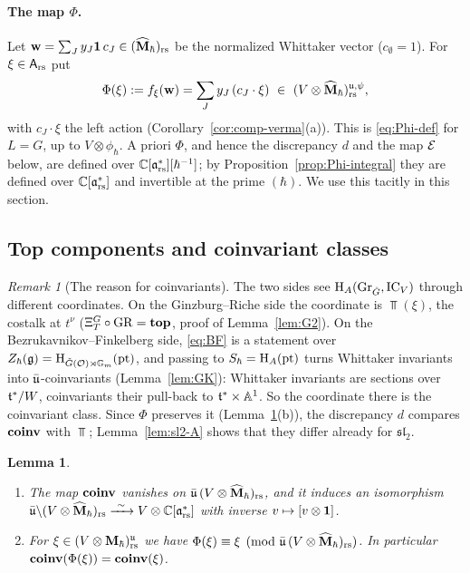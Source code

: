 \documentclass{article}
\theoremstyle{plain}
\newtheorem{lemma}[theorem]{Lemma}
\theoremstyle{definition}
\theoremstyle{remark}
\newtheorem{remark}[theorem]{Remark}
\numberwithin{equation}{section}
\begin{document}
\paragraph{The map $\Phi$.}
Let $\mathbf w=\sum_Jy_J\mathbf 1\,c_J\in(\widehat{\mathbf M}_\hbar)_{\mathrm{rs}}$ be the normalized Whittaker vector ($c_\emptyset=1$). For $\xi\in\mathsf A_{\mathrm{rs}}$ put
\begin{equation}\label{eq:Phi-G}
\Phi(\xi):=f_\xi(\wv)=\sum_Jy_J\,(c_J\cdot\xi)\ \in\ (V\otimes\Mhat)_\rs^{\fraku,\psi},
\end{equation}
with $c_J\cdot\xi$ the left action (Corollary~\ref{cor:comp-verma}(a)). This is \eqref{eq:Phi-def} for $L=G$, up to $V\otimes\phi_\hbar$. A priori $\Phi$, and hence the discrepancy $d$ and the map $\mathcal E$ below, are defined over $\mathbb{C}[\mathfrak{a}^*_{\mathrm{rs}}][\hbar^{-1}]$; by Proposition~\ref{prop:Phi-integral} they are defined over $\mathbb{C}[\mathfrak{a}^*_{\mathrm{rs}}]$ and invertible at the prime $(\hbar)$. We use this tacitly in this section.

\subsection{Top components and coinvariant classes}\label{sec:disc-class}

\begin{remark}[The reason for coinvariants]\label{rem:why-coinv}
The two sides see $\mathrm{H}_A(\operatorname{Gr}_{{\check{G}}},\operatorname{IC}_V)$ through different coordinates. On the Ginzburg--Riche side the coordinate is $\Top(\xi)$, the costalk at $t^\nu$ ($\Xi^G_T\circ\mathrm{GR}=\operatorname{\mathbf{top}}$, proof of Lemma~\ref{lem:G2}). On the Bezrukavnikov--Finkelberg side, \eqref{eq:BF} is a statement over $Z_\hbar(\mathfrak{g})=\mathrm{H}_{{\check{G}}(\mathcal{O})\rtimes\mathbb{G}_m}(\mathrm{pt})$, and passing to $S_\hbar=\mathrm{H}_A(\mathrm{pt})$ turns Whittaker invariants into $\bar{\mathfrak u}$-coinvariants (Lemma~\ref{lem:GK}): Whittaker invariants are sections over $\mathfrak{t}^*/W$, coinvariants their pull-back to $\mathfrak{t}^*\times\mathbb{A}^1$. So the coordinate there is the coinvariant class. Since $\Phi$ preserves it (Lemma~\ref{lem:class}(b)), the discrepancy $d$ compares $\operatorname{\mathbf{coinv}}$ with $\Top$; Lemma~\ref{lem:sl2-A} shows that they differ already for $\mathfrak{sl}_2$.
\end{remark}

\begin{lemma}\label{lem:class}
\begin{enumerate}[label=(\alph*)]
\item The map $\operatorname{\mathbf{coinv}}$ vanishes on $\bar{\mathfrak u}\,(V\otimes\widehat{\mathbf M}_\hbar)_{\mathrm{rs}}$, and it induces an isomorphism $\ub\backslash(V\otimes\Mhat)_\rs\xrightarrow{\ \sim\ }V\otimes\Crs$ with inverse $v\mapsto[v\otimes\mathbf 1]$.
\item For $\xi\in(V\otimes\mathbf{M}_\hbar)^{\mathfrak{u}}_{\mathrm{rs}}$ we have $\Phi(\xi)\equiv\xi\pmod{\bar{\mathfrak u}\,(V\otimes\widehat{\mathbf M}_\hbar)_{\mathrm{rs}}}$. In particular $\operatorname{\mathbf{coinv}}(\Phi(\xi))=\operatorname{\mathbf{coinv}}(\xi)$.
\end{enumerate}
\end{lemma}
\end{document}
